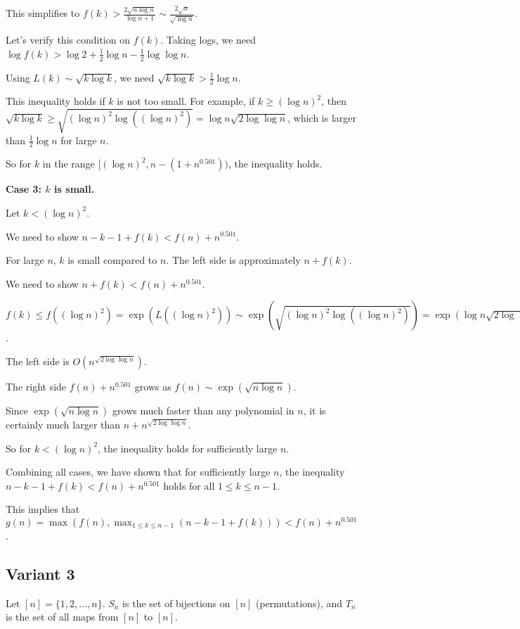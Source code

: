 \documentclass[12pt,a4paper]{article}
\theoremstyle{definition}
\begin{document}
    This simplifies to $f(k) > \frac{2\sqrt{n\log n}}{\log n+1} \sim \frac{2\sqrt{n}}{\sqrt{\log n}}$.

    Let's verify this condition on $f(k)$. Taking logs, we need $\log f(k) > \log 2 + \frac{1}{2}\log n - \frac{1}{2}\log\log n$.

    Using $L(k) \sim \sqrt{k \log k}$, we need $\sqrt{k \log k} > \frac{1}{2}\log n$.

    This inequality holds if $k$ is not too small. For example, if $k \geq (\log n)^2$, then $\sqrt{k\log k} \geq \sqrt{(\log n)^2 \log((\log n)^2)} = \log n \sqrt{2\log\log n}$, which is larger than $\frac{1}{2}\log n$ for large $n$.

    So for $k$ in the range $[(\log n)^2, n-(1+n^{0.501}))$, the inequality holds.

    \textbf{Case 3: $k$ is small.}

    Let $k < (\log n)^2$.

    We need to show $n-k-1+f(k) < f(n)+n^{0.501}$.

    For large $n$, $k$ is small compared to $n$. The left side is approximately $n+f(k)$.

    We need to show $n+f(k) < f(n)+n^{0.501}$.

    $f(k) \leq f((\log n)^2) = \exp(L((\log n)^2)) \sim \exp(\sqrt{(\log n)^2 \log((\log n)^2)}) = \exp(\log n \sqrt{2\log\log n}) = n^{\sqrt{2\log\log n}}$.

    The left side is $O(n^{\sqrt{2\log\log n}})$.

    The right side $f(n)+n^{0.501}$ grows as $f(n) \sim \exp(\sqrt{n\log n})$.

    Since $\exp(\sqrt{n\log n})$ grows much faster than any polynomial in $n$, it is certainly much larger than $n+n^{\sqrt{2\log\log n}}$.

    So for $k < (\log n)^2$, the inequality holds for sufficiently large $n$.

    Combining all cases, we have shown that for sufficiently large $n$, the inequality $n-k-1+f(k) < f(n) + n^{0.501}$ holds for all $1 \leq k \leq n-1$.

    This implies that $g(n) = \max(f(n), \max_{1\leq k \leq n-1} (n-k-1+f(k))) < f(n) + n^{0.501}$.

\subsection{Variant 3}
    Let $[n] = \{1, 2, \dots, n\}$. $S_n$ is the set of bijections on $[n]$ (permutations), and $T_n$ is the set of all maps from $[n]$ to $[n]$.
\end{document}
